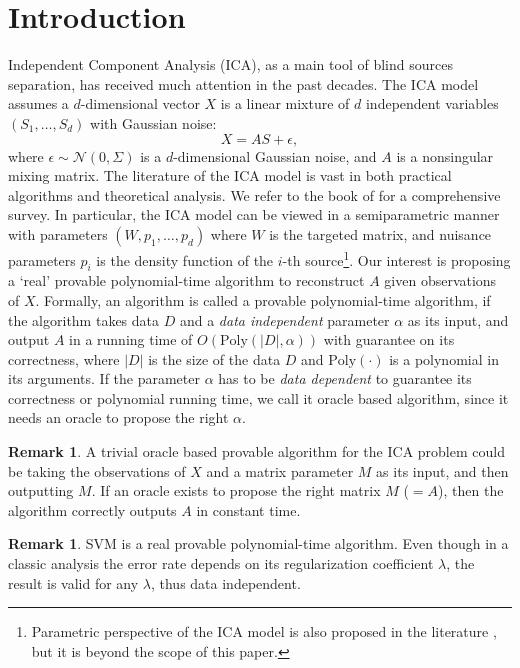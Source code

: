 \documentclass[twoside]{article}
\theoremstyle{definition}
\newtheorem{remark}[lemma]{Remark}
\begin{document}
\section{Introduction}
\label{sec:Intro}
Independent Component Analysis (ICA), as a main tool of blind sources separation, has received much attention in the past decades. 
The ICA model assumes a $d$-dimensional vector $X$ is a linear mixture of $d$ independent variables $(S_1,\ldots, S_d)$ with Gaussian noise:
\[
X = AS+\epsilon,
\]
where $\epsilon \sim \mathcal{N}(0,\Sigma)$ is a $d$-dimensional Gaussian noise, and $A$ is a nonsingular mixing matrix.
The literature of the ICA model is vast in both practical algorithms and theoretical analysis. 
We refer to the book of \citet{comon2010handbook} for a comprehensive survey.
In particular, the ICA model can be viewed in a semiparametric manner with parameters $(W, p_1, \ldots, p_d)$ where $W$ is the targeted matrix, and nuisance parameters $p_i$ is the density function of the $i$-th source\footnote{Parametric perspective of the ICA model is also proposed in the literature \citep{pham1997blind,lee1999independent}, but it is beyond the scope of this paper.}. 
Our interest is proposing a `real' provable polynomial-time algorithm to reconstruct $A$ given observations of $X$.
Formally, an algorithm is called a provable polynomial-time algorithm, if the algorithm takes data $D$ and a \emph{data independent} parameter $\alpha$ as its input, and output $A$ in a running time of  $O\left(\text{Poly}(|D|, \alpha)\right)$ with guarantee on its correctness, where $|D|$ is the size of the data $D$ and $\text{Poly}(\cdot)$ is a polynomial in its arguments. 
If the parameter $\alpha$ has to be \emph{data dependent} to guarantee its correctness or polynomial running time, we call it oracle based algorithm, since it needs an oracle to propose the right $\alpha$. 
\begin{remark}
A trivial oracle based provable algorithm for the ICA problem could be taking the observations of $X$ and a matrix parameter $M$ as its input, and then outputting $M$. 
If an oracle exists to propose the right matrix $M$ ($=A$), then the algorithm correctly outputs $A$ in constant time. 
\end{remark}
\begin{remark}
SVM is a real provable polynomial-time algorithm. Even though in a classic analysis the error rate depends on its regularization coefficient $\lambda$, the result is valid for any $\lambda$, thus data independent. 
\end{remark}
\end{document}
